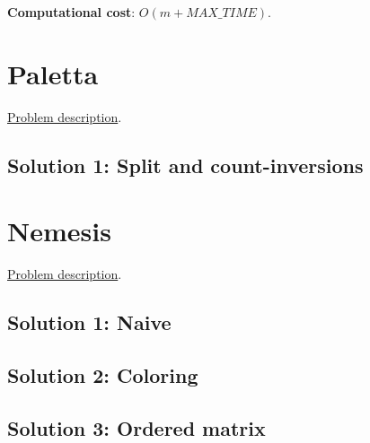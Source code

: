 \documentclass{article}
\begin{document}
\begin{framed}
  \noindent
  \textbf{Computational cost}: $O(m + MAX\_TIME)$.
\end{framed}

\section{Paletta}
\href{http://didawiki.cli.di.unipi.it/lib/exe/fetch.php/magistraleinformatica/alg2/algo2_16/paletta.pdf}{Problem description}.
\subsection{Solution 1: Split and count-inversions}

\section{Nemesis}
\href{http://didawiki.cli.di.unipi.it/lib/exe/fetch.php/magistraleinformatica/alg2/algo2_16/nemesi.pdf}{Problem description}.
\subsection{Solution 1: Naive}

\subsection{Solution 2: Coloring}

\subsection{Solution 3: Ordered matrix}
\end{document}
